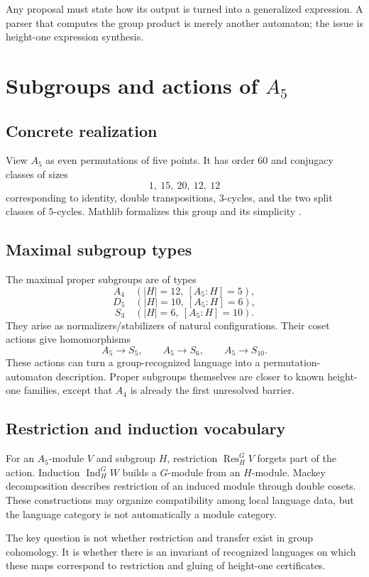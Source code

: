 \documentclass{amsart}
\begin{document}
Any proposal must state how its output is turned into a generalized expression.  A parser that computes the group product is merely another automaton; the issue is height-one expression synthesis.

\section{Subgroups and actions of $A_5$}

\subsection{Concrete realization}

View $A_5$ as even permutations of five points.  It has order $60$ and conjugacy classes of sizes
\[
  1,\ 15,\ 20,\ 12,\ 12
\]
corresponding to identity, double transpositions, $3$-cycles, and the two split classes of $5$-cycles.  Mathlib formalizes this group and its simplicity \cite{mathlibAlternating2026}.

\subsection{Maximal subgroup types}

The maximal proper subgroups are of types
\[
  A_4\quad(|H|=12,\ [A_5:H]=5),
\]
\[
  D_5\quad(|H|=10,\ [A_5:H]=6),
\]
\[
  S_3\quad(|H|=6,\ [A_5:H]=10).
\]
They arise as normalizers/stabilizers of natural configurations.  Their coset actions give homomorphisms
\[
  A_5\to S_5,\qquad A_5\to S_6,\qquad A_5\to S_{10}.
\]
These actions can turn a group-recognized language into a permutation-automaton description.  Proper subgroups themselves are closer to known height-one families, except that $A_4$ is already the first unresolved barrier.

\subsection{Restriction and induction vocabulary}

For an $A_5$-module $V$ and subgroup $H$, restriction $\operatorname{Res}^G_HV$ forgets part of the action.  Induction $\operatorname{Ind}^G_HW$ builds a $G$-module from an $H$-module.  Mackey decomposition describes restriction of an induced module through double cosets.  These constructions may organize compatibility among local language data, but the language category is not automatically a module category.

The key question is not whether restriction and transfer exist in group cohomology.  It is whether there is an invariant of recognized languages on which these maps correspond to restriction and gluing of height-one certificates.
\end{document}
